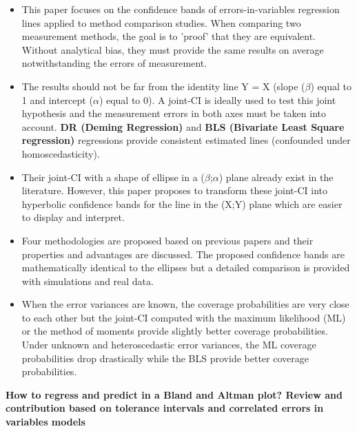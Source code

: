 \begin{itemize}
	\item This paper focuses on the confidence bands of errors-in-variables regression lines applied to method comparison studies. When comparing two measurement methods, the goal is to ’proof’ that they are equivalent. Without analytical bias, they must provide the same results on average notwithstanding the errors of measurement. 
	
\item The results should not be far from the identity line Y = X (slope ($\beta$) equal to 1 and intercept ($\alpha$) equal to 0). A joint-CI is ideally used to test this joint hypothesis and the measurement errors in both axes must be taken into account. \textbf{DR (Deming Regression)} and \textbf{BLS (Bivariate Least Square regression)} regressions provide consistent estimated lines (confounded under homoscedasticity). 

\item Their joint-CI with a shape of ellipse in a ($\beta$;$\alpha$) plane already exist in the literature. However, this paper proposes to transform these joint-CI into hyperbolic confidence bands for the line in the (X;Y) plane which are easier to display and interpret. 

\item Four methodologies are proposed based on previous papers and their properties and advantages are discussed. The proposed confidence bands are mathematically identical to the ellipses but a detailed comparison is provided with simulations and real data.
	
\item When the error variances are known, the coverage probabilities are very close to each other but the joint-CI computed with the maximum likelihood (ML) or the method of moments provide slightly better coverage probabilities. Under unknown and heteroscedastic error variances, the ML coverage probabilities drop drastically while the BLS provide better coverage probabilities.
	
\end{itemize}

\newpage

\textbf{How to regress and predict in a Bland and Altman plot? Review and contribution based on tolerance intervals and correlated errors in variables models}

